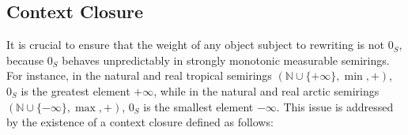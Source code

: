 \subsection{Context Closure}
\label{sec:context_closure}

It is crucial to ensure that the weight of any object subject to rewriting is not $0_S$, because \(0_S\) behaves unpredictably in strongly monotonic measurable semirings. For instance, in the natural and real tropical semirings \((\mathbb{N} \cup \{+\infty\}, \min, +)\), \(0_S\) is the greatest element \(+\infty\), while in the natural and real arctic semirings \((\mathbb{N} \cup \{-\infty\}, \max, +)\), \(0_S\) is the smallest element \(-\infty\).
This issue is addressed by the existence of a context closure defined as follows:



